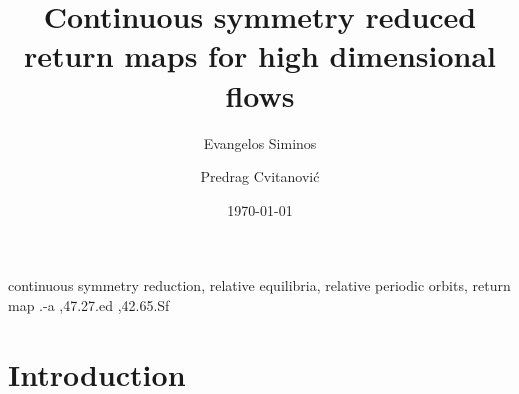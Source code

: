 \documentclass[aps,prl,preprint,superscriptaddress]{revtex4}
\begin{document}
    \ifoldMikTeX %
    \else
{}
\begin{frontmatter}
    \fi          %


			\title{
Continuous symmetry reduced return maps for high dimensional flows
			}
\author[gatech]{Evangelos Siminos}
\author[gatech]{Predrag Cvitanovi\'c}
\address[gatech]{Center for Nonlinear Science,
School of Physics, Georgia Institute of Technology,
Atlanta, GA 30332-0430}


\date{\today}

\begin{abstract}

\end{abstract}

    \ifoldMikTeX %
    \else
\begin{keyword}
continuous symmetry reduction, relative equilibria, relative periodic orbits, return map
.-a \sep 47.27.ed \sep 42.65.Sf
\end{keyword}
\end{frontmatter}
    \fi %

\section{\label{s:intro} Introduction}
    

\subsection{\label{s:introCLE} \CLe}
    
\end{document}
